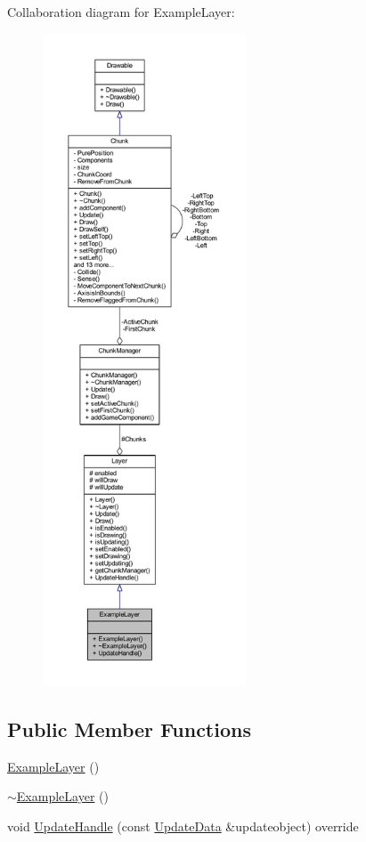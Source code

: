 Collaboration diagram for Example\-Layer\-:\nopagebreak
\begin{figure}[H]
\begin{center}
\leavevmode
\includegraphics[height=550pt]{class_example_layer__coll__graph}
\end{center}
\end{figure}
\subsection*{Public Member Functions}
\begin{DoxyCompactItemize}
\item 
\hyperlink{class_example_layer_a199ad822f707990b69e998a9ed7df5bb}{Example\-Layer} ()
\item 
\hyperlink{class_example_layer_a243387a90a54149af7d128301e836522}{$\sim$\-Example\-Layer} ()
\item 
void \hyperlink{class_example_layer_a97b36d082a4b5dd7e145773fca666490}{Update\-Handle} (const \hyperlink{class_update_data}{Update\-Data} \&updateobject) override
\end{DoxyCompactItemize}
